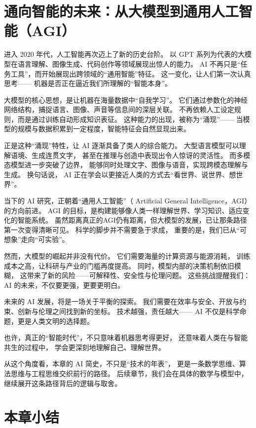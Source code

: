 \section{通向智能的未来：从大模型到通用人工智能（AGI）}

进入 2020 年代，人工智能再次迈上了新的历史台阶。  
以 GPT 系列为代表的大模型在语言理解、图像生成、代码创作等领域展现出惊人的能力。  
 AI  不再只是“任务工具”，而开始展现出跨领域的“通用智能”特征。  
这一变化，让人们第一次认真思考——  
机器是否正在逼近我们所理解的“智能本身”。  

大模型的核心思想，是让机器在海量数据中“自我学习”。  
它们通过参数化的神经网络结构，捕捉语言、图像、声音等信息间的深层关联。  
不再依赖人工设定规则，而是通过训练自动形成知识表征。  
这种能力的出现，被称为“涌现”——  
当模型的规模与数据积累到一定程度，智能特征会自然显现出来。  

正是这种“涌现”特性，让 AI 逐渐具备了类人的综合能力。  
大型语言模型可以理解语境、生成连贯文字，  
甚至在推理与创造中表现出令人惊讶的灵活性。  
而多模态模型进一步突破了边界，  
能够同时处理文字、图像与语音，实现跨模态理解与生成。  
换句话说， AI 正在学会以更接近人类的方式去“看世界、说世界、想世界”。  

当下的 AI 研究，正朝着“通用人工智能”（ Artificial General Intelligence，AGI）的方向前进。  
AGI 的目标，是构建能够像人类一样理解世界、学习知识、适应变化的智能系统。  
虽然距离真正的AGI仍有距离，但大模型的发展，已让那条路径第一次变得清晰可见。  
科学的脚步并不需要急于求成，  
重要的是，我们已从“可想象”走向“可实验”。  

然而，大模型的崛起并非没有代价。  
它们需要海量的计算资源与能源消耗，  
训练成本之高，让科研与产业的门槛再度提高。  
同时，模型内部的决策机制依旧模糊，  
这带来了新的风险——可解释性、安全性与伦理问题。  
这些挑战提醒我们： AI 的未来，不仅要更强，更要更明白。  

未来的 AI 发展，将是一场关于平衡的探索。  
我们需要在效率与安全、开放与约束、创新与伦理之间找到新的坐标。  
技术越强，责任越大——  
 AI  不仅是科学命题，更是人类文明的选择题。  
 
也许，真正的“智能时代”，不只意味着机器思考得更好，  
还意味着人类在与智能共生的过程中，  
学会更深刻地理解自己、理解世界。  

从这个角度看，本章的 AI 简史，不只是“技术的年表”，  
更是一条数学思维、算法思维与工程思维交织前行的路径。  
后续章节，我们会在具体的数学与模型中，继续展开这条路径背后的逻辑与取舍。 

\section{本章小结}
